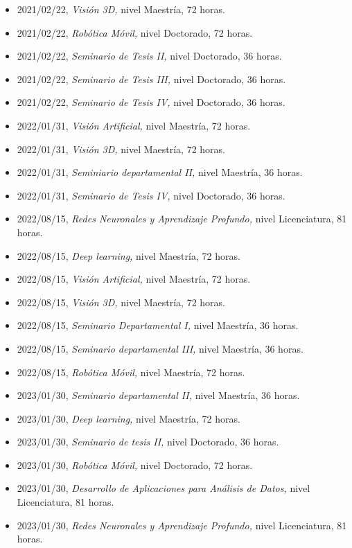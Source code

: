 \begin{itemize} 
\item 2021/02/22, \textit{ Visión 3D,} nivel Maestría, 72 horas. 
\item 2021/02/22, \textit{ Robótica Móvil,} nivel Doctorado, 72 horas. 
\item 2021/02/22, \textit{ Seminario de Tesis II,} nivel Doctorado, 36 horas. 
\item 2021/02/22, \textit{ Seminario de Tesis III,} nivel Doctorado, 36 horas. 
\item 2021/02/22, \textit{ Seminario de Tesis IV,} nivel Doctorado, 36 horas. 
\item 2022/01/31, \textit{ Visión Artificial,} nivel Maestría, 72 horas. 
\item 2022/01/31, \textit{ Visión 3D,} nivel Maestría, 72 horas. 
\item 2022/01/31, \textit{ Seminiario departamental II,} nivel Maestría, 36 horas. 
\item 2022/01/31, \textit{ Seminario de Tesis IV,} nivel Doctorado, 36 horas. 
\item 2022/08/15, \textit{ Redes Neuronales y Aprendizaje Profundo,} nivel Licenciatura, 81 horas. 
\item 2022/08/15, \textit{ Deep learning,} nivel Maestría, 72 horas. 
\item 2022/08/15, \textit{ Visión Artificial,} nivel Maestría, 72 horas. 
\item 2022/08/15, \textit{ Visión 3D,} nivel Maestría, 72 horas. 
\item 2022/08/15, \textit{ Seminario Departamental I,} nivel Maestría, 36 horas. 
\item 2022/08/15, \textit{ Seminario departamental III,} nivel Maestría, 36 horas. 
\item 2022/08/15, \textit{ Robótica Móvil,} nivel Maestría, 72 horas. 
\item 2023/01/30, \textit{ Seminario departamental II,} nivel Maestría, 36 horas. 
\item 2023/01/30, \textit{ Deep learning,} nivel Maestría, 72 horas. 
\item 2023/01/30, \textit{ Seminario de tesis II,} nivel Doctorado, 36 horas. 
\item 2023/01/30, \textit{ Robótica Móvil,} nivel Doctorado, 72 horas. 
\item 2023/01/30, \textit{ Desarrollo de Aplicaciones para Análisis de Datos,} nivel Licenciatura, 81 horas. 
\item 2023/01/30, \textit{ Redes Neuronales y Aprendizaje Profundo,} nivel Licenciatura, 81 horas. 

\end{itemize}
